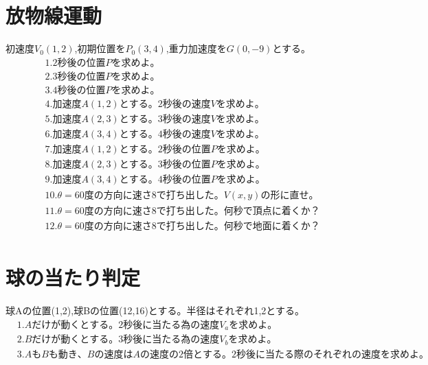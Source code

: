 \documentclass[paper=b4j,landscape,twocolumn,fleqn]{jlreq}
\begin{document}
\section{放物線運動}
初速度$V_0(1,2)$,初期位置を$P_0(3,4)$,重力加速度を$G(0,-9)$とする。
\begin{align*}
&1.　2秒後の位置Pを求めよ。\\
&2.　3秒後の位置Pを求めよ。\\
&3.　4秒後の位置Pを求めよ。\\
&4.　加速度A(1,2)とする。2秒後の速度Vを求めよ。\\
&5.　加速度A(2,3)とする。3秒後の速度Vを求めよ。\\
&6.　加速度A(3,4)とする。4秒後の速度Vを求めよ。\\
&7.　加速度A(1,2)とする。2秒後の位置Pを求めよ。\\
&8.　加速度A(2,3)とする。3秒後の位置Pを求めよ。\\
&9.　加速度A(3,4)とする。4秒後の位置Pを求めよ。\\
&10.　\theta=60度の方向に速さ8で打ち出した。V(x,y)の形に直せ。\\
&11.　\theta=60度の方向に速さ8で打ち出した。何秒で頂点に着くか？\\
&12.　\theta=60度の方向に速さ8で打ち出した。何秒で地面に着くか？\\
\end{align*}
\section{球の当たり判定}
球Aの位置(1,2),球Bの位置(12,16)とする。半径はそれぞれ1,2とする。
\begin{align*}
&1.　Aだけが動くとする。2秒後に当たる為の速度V_aを求めよ。\\
&2.　Bだけが動くとする。3秒後に当たる為の速度V_bを求めよ。\\
&3.　AもBも動き、Bの速度はAの速度の2倍とする。2秒後に当たる際のそれぞれの速度を求めよ。\\
\end{align*}
\end{document}
